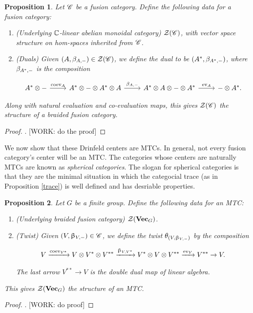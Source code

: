 \documentclass{article}
\newtheorem{proposition}{Proposition}[section]
\theoremstyle{definition}
\numberwithin{figure}{section}
\begin{document}
\begin{proposition} Let $\mathscr{C}$ be a fusion category. Define the following data for a fusion category:

\begin{enumerate}
\item (Underlying $\mathbb{C}$-linear abelian monoidal category) $\mathcal{Z}(\mathscr{C})$, with vector space structure on hom-spaces inherited from $\mathscr{C}$.

\item (Duals) Given $(A,\beta_{A,\--})\in \mathcal{Z}(\mathscr{C})$, we define the dual to be $(A^*,\beta_{A^*,\--})$, where $\beta_{A^*,\--}$ is the composition

\[\begin{tikzcd}
	{A^*\otimes \--} & {A^*\otimes \-- \otimes A^*\otimes A} & {A^*\otimes A\otimes \-- \otimes A^*} & {\--\otimes A^*}.
	\arrow["{\coev_{A}}", from=1-1, to=1-2]
	\arrow["{\beta_{A,\--}}", from=1-2, to=1-3]
	\arrow["{\ev_A}", from=1-3, to=1-4]
\end{tikzcd}\]
\end{enumerate}

Along with natural evaluation and co-evaluation maps, this gives $\mathcal{Z}(\mathscr{C})$ the structure of a braided fusion category.
\end{proposition}
\begin{proof}. [WORK: do the proof]
\end{proof}

We now show that these Drinfeld centers are MTCs. In general, not every fusion category's center will be an MTC. The categories whose centers are naturally MTCs are known as \textit{spherical categories}. The slogan for spherical categories is that they are the minimal situation in which the categocial trace (as in Proposition \ref{trace}) is well defined and has desriable properties.

\begin{proposition} Let $G$ be a finite group. Define the following data for an MTC:

\begin{enumerate}
\item (Underlying braided fusion category) $\mathcal{Z}(\bold{Vec}_G)$.
\item (Twist) Given $(V,\upbeta_{V,\--})\in \mathscr{C}$, we define the twist $\theta_{(V,\upbeta_{V,\--})}$ by the composition

$$V\xrightarrow{\mathrm{coev}_{V^*}} V\otimes V^*\otimes V^{**}\xrightarrow{\upbeta_{V,V^*}} V^*\otimes V \otimes V^{**}\xrightarrow{\mathrm{ev}_{V}} V^{**}\to V.$$

The last arrow $V^{**}\to V$ is the double dual map of linear algebra.
\end{enumerate}

This gives $\mathcal{Z}(\bold{Vec}_G)$ the structure of an MTC.
\end{proposition}
\begin{proof}. [WORK: do proof]
\end{proof}
\end{document}
